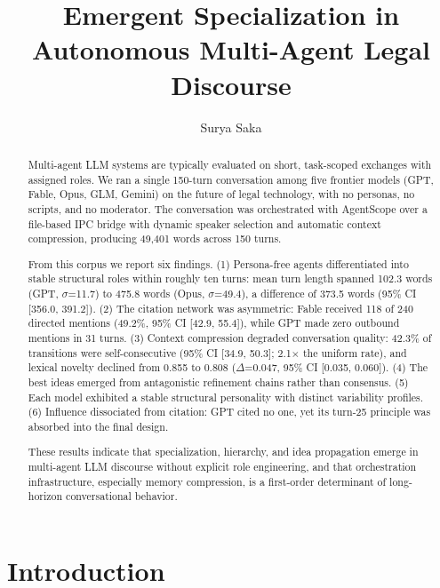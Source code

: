 \documentclass[sigconf,nonacm=true]{acmart}
\begin{document}
\title{Emergent Specialization in Autonomous Multi-Agent Legal Discourse}

\author{Surya Saka}


\begin{abstract}
Multi-agent LLM systems are typically evaluated on short, task-scoped exchanges with assigned roles. We ran a single 150-turn conversation among five frontier models (GPT, Fable, Opus, GLM, Gemini) on the future of legal technology, with no personas, no scripts, and no moderator. The conversation was orchestrated with AgentScope over a file-based IPC bridge with dynamic speaker selection and automatic context compression, producing 49{,}401 words across 150 turns.

From this corpus we report six findings. (1) Persona-free agents differentiated into stable structural roles within roughly ten turns: mean turn length spanned 102.3 words (GPT, $\sigma$=11.7) to 475.8 words (Opus, $\sigma$=49.4), a difference of 373.5 words (95\% CI [356.0, 391.2]). (2) The citation network was asymmetric: Fable received 118 of 240 directed mentions (49.2\%, 95\% CI [42.9, 55.4]), while GPT made zero outbound mentions in 31 turns. (3) Context compression degraded conversation quality: 42.3\% of transitions were self-consecutive (95\% CI [34.9, 50.3]; 2.1$\times$ the uniform rate), and lexical novelty declined from 0.855 to 0.808 ($\Delta$=0.047, 95\% CI [0.035, 0.060]). (4) The best ideas emerged from antagonistic refinement chains rather than consensus. (5) Each model exhibited a stable structural personality with distinct variability profiles. (6) Influence dissociated from citation: GPT cited no one, yet its turn-25 principle was absorbed into the final design.

These results indicate that specialization, hierarchy, and idea propagation emerge in multi-agent LLM discourse without explicit role engineering, and that orchestration infrastructure, especially memory compression, is a first-order determinant of long-horizon conversational behavior.
\end{abstract}

\maketitle

\section{Introduction}
\end{document}
